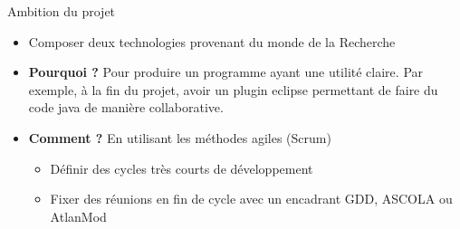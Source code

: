 \begin{frame}{Ambition du projet}
\begin{itemize}
  \item Composer deux technologies provenant du monde de la Recherche
  \item \textbf{Pourquoi ?} Pour produire un programme ayant une utilité claire.
  Par exemple, à la fin du projet, avoir un plugin eclipse permettant de faire
  du code java de manière collaborative.
  \item \textbf{Comment ?} En utilisant les méthodes agiles (Scrum)
    \begin{itemize}
    \item Définir des cycles très courts de développement
    \item Fixer des réunions en fin de cycle avec un encadrant GDD, ASCOLA ou
    AtlanMod
    \end{itemize}
\end{itemize}
\end{frame}

